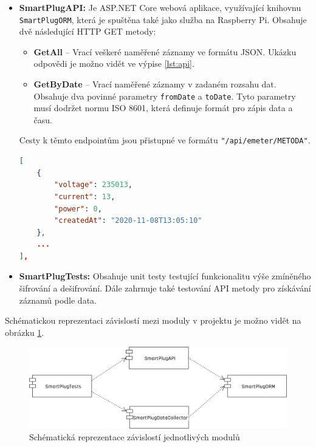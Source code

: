 \documentclass[czech,master,dept460,male,cpp,cpdeclaration,oneside]{diploma}
\begin{document}
\begin{itemize}
\item \textbf{SmartPlugAPI:}
Je ASP.NET Core webová aplikace, využívající knihovnu \texttt{SmartPlugORM}, která je spuštěna také jako služba na Raspberry Pi. Obsahuje dvě následující HTTP GET metody:
\begin{itemize}
	\item \textbf{GetAll} – Vrací veškeré naměřené záznamy ve formátu JSON. Ukázku odpovědi je možno vidět ve výpise \ref{lst:api}.
	\item \textbf{GetByDate} – Vrací naměřené záznamy v zadaném rozsahu dat. Obsahuje dva povinné parametry \texttt{fromDate} a \texttt{toDate}. Tyto parametry musí dodržet normu ISO 8601, která definuje formát pro zápis data a času.
\end{itemize}
\noindent Cesty k těmto endpointům jsou přistupné ve formátu \texttt{"/api/emeter/METODA"}.
\bigbreak
\begin{lstlisting}[language=json,caption=Ukázka odpovědi aplikačního rozhraní,label={lst:api}]
[
	{
		"voltage": 235013,
		"current": 13,
		"power": 0,
		"createdAt": "2020-11-08T13:05:10"
	},
	...
],
\end{lstlisting}

\item \textbf{SmartPlugTests:}
Obsahuje unit testy testující funkcionalitu výše zmíněného šifrování a dešifrování. Dále zahrnuje také testování API metody pro získávání záznamů podle data.
		
\end{itemize}

\bigbreak
\noindent Schématickou reprezentaci závislostí mezi moduly v projektu je možno vidět na obrázku \ref{fig:ProjectDependency}.

\bigbreak

\begin{figure}[h!]
	\centering
	\includegraphics[width=1\textwidth]{Figures/ProjectDependency.png}
	\caption{Schématická reprezentace závislostí jednotlivých modulů}
	\label{fig:ProjectDependency}
\end{figure}

\pagebreak
\end{document}
